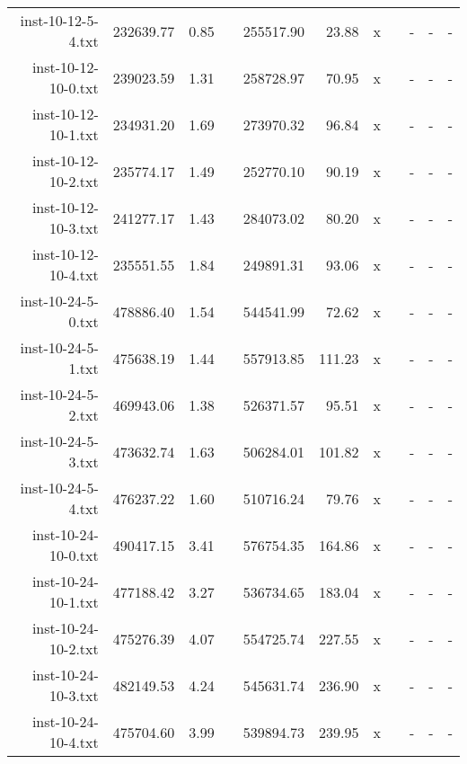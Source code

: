 \begin{table*}[h!]
\begin{tabular}{@{}rrrcrrrcrrr@{}}
inst-10-12-5-4.txt & 232639.77 & 0.85 & & 255517.90 & 23.88 & x & & - & - & - \\
inst-10-12-10-0.txt & 239023.59 & 1.31 & & 258728.97 & 70.95 & x & & - & - & - \\
inst-10-12-10-1.txt & 234931.20 & 1.69 & & 273970.32 & 96.84 & x & & - & - & - \\
inst-10-12-10-2.txt & 235774.17 & 1.49 & & 252770.10 & 90.19 & x & & - & - & - \\
inst-10-12-10-3.txt & 241277.17 & 1.43 & & 284073.02 & 80.20 & x & & - & - & - \\
inst-10-12-10-4.txt & 235551.55 & 1.84 & & 249891.31 & 93.06 & x & & - & - & - \\
inst-10-24-5-0.txt & 478886.40 & 1.54 & & 544541.99 & 72.62 & x & & - & - & - \\
inst-10-24-5-1.txt & 475638.19 & 1.44 & & 557913.85 & 111.23 & x & & - & - & - \\
inst-10-24-5-2.txt & 469943.06 & 1.38 & & 526371.57 & 95.51 & x & & - & - & - \\
inst-10-24-5-3.txt & 473632.74 & 1.63 & & 506284.01 & 101.82 & x & & - & - & - \\
inst-10-24-5-4.txt & 476237.22 & 1.60 & & 510716.24 & 79.76 & x & & - & - & - \\
inst-10-24-10-0.txt & 490417.15 & 3.41 & & 576754.35 & 164.86 & x & & - & - & - \\
inst-10-24-10-1.txt & 477188.42 & 3.27 & & 536734.65 & 183.04 & x & & - & - & - \\
inst-10-24-10-2.txt & 475276.39 & 4.07 & & 554725.74 & 227.55 & x & & - & - & - \\
inst-10-24-10-3.txt & 482149.53 & 4.24 & & 545631.74 & 236.90 & x & & - & - & - \\
inst-10-24-10-4.txt & 475704.60 & 3.99 & & 539894.73 & 239.95 & x & & - & - & - \\

\end{tabular}
\end{table*}